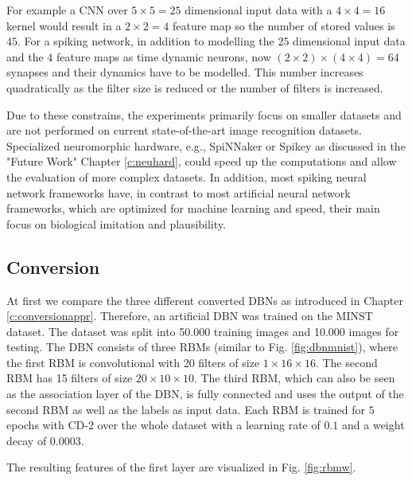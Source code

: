 For example a CNN over $5 \times 5 = 25$ dimensional input data with a $4 \times 4 = 16$ kernel would result in a $2 \times 2 = 4$ feature map so the number of stored values is $45$. 
For a spiking network, in addition to modelling the $25$ dimensional input data and the $4$ feature maps as time dynamic neurons, now $(2 \times 2) \times (4 \times 4) = 64$ synapses and their dynamics have to be modelled.
This number increases quadratically as the filter size is reduced or the number of filters is increased.

Due to these constrains, the experiments primarily focus on smaller datasets and are not performed on current state-of-the-art image recognition datasets. 
Specialized neuromorphic hardware, e.g., SpiNNaker or Spikey as discussed in the "Future Work" Chapter \ref{c:neuhard}, could speed up the computations and allow the evaluation of more complex datasets.  
In addition, most spiking neural network frameworks have, in contrast to most artificial neural network frameworks, which are optimized for machine learning and speed, their main focus on biological imitation and plausibility.


\subsection{Conversion} \label{c:conversionexp}

At first we compare the three different converted DBNs as introduced in Chapter \ref{c:conversionappr}.
Therefore, an artificial DBN was trained on the MINST dataset.
The dataset was split into 50.000 training images and 10.000 images for testing.
The DBN consists of three RBMs (similar to Fig. \ref{fig:dbnmnist}), where the first RBM is convolutional with 20 filters of size $1 \times 16 \times 16$. 
The second RBM has 15 filters of size $20 \times 10 \times 10$. 
The third RBM, which can also be seen as the association layer of the DBN, is fully connected and uses the output of the second RBM as well as the labels as input data.  
Each RBM is trained for $5$ epochs with CD-$2$ over the whole dataset with a learning rate of $0.1$ and a weight decay of $0.0003$.

The resulting features of the first layer are visualized in Fig. \ref{fig:rbmw}.

